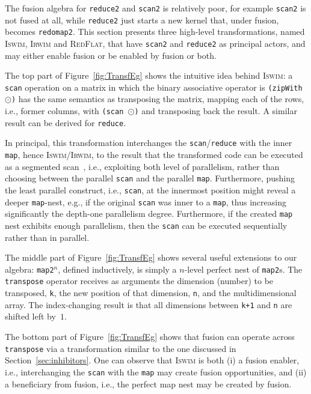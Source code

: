 \documentclass{sigplanconf}  %
\begin{document}
The fusion algebra for {\tt reduce2} and {\tt scan2} is relatively poor,
for example {\tt scan2} is not fused at all, while {\tt reduce2} just
starts a new kernel that, under fusion, becomes {\tt redomap2}.
This section presents three high-level transformations, named
\textsc{Iswim}, \textsc{Irwim} and \textsc{RedFlat}, that have 
{\tt scan2} and {\tt reduce2} as principal actors, and may either
enable fusion or be enabled by fusion or both.

The top part of Figure~\ref{fig:TransfEg} shows the intuitive idea
behind \textsc{Iswim}: a {\tt scan} operation on a matrix in which
the binary associative operator is {\tt (zipWith $\odot$)} has the
same semantics as transposing the matrix, mapping each of the rows,
i.e., former columns, with {\tt (scan $\odot$)} and transposing back
the result. A similar result can be derived for {\tt reduce}.

In principal, this transformation interchanges the {\tt scan}/{\tt reduce}
with the inner {\tt map}, hence \textsc{Iswim}/\textsc{Irwim}, to the result
that the transformed code can be executed as a segmented scan~\cite{segScan},
i.e., exploiting both level of parallelism, rather than choosing between
the parallel {\tt scan} and the parallel {\tt map}. Furthermore, pushing
the least parallel construct, i.e., {\tt scan}, at the innermost position 
might reveal a deeper {\tt map}-nest, e.g., if the original {\tt scan} was 
inner to a {\tt map}, thus increasing significantly the depth-one 
parallelism degree.   
Furthermore, if the created {\tt map} nest exhibits enough parallelism, 
then the {\tt scan} can be executed sequentially rather than in parallel. %

The middle part of Figure~\ref{fig:TransfEg} shows several useful 
extensions to our algebra: {\tt map2$^n$}, defined inductively, is
simply a $n$-level perfect nest of {\tt map2}s.   The {\tt transpose} 
operator receives as arguments the dimension (number) to be transposed, {\tt k}, 
the new position of that dimension, {\tt n}, and the multidimensional array.
The index-changing result is that all dimensions between {\tt k+1} and {\tt n}
are shifted left by~$1$.   

The bottom part of Figure~\ref{fig:TransfEg} shows that fusion can operate 
across {\tt transpose} via a transformation similar to the one discussed
in Section~\ref{sec:inhibitors}. One can observe that \textsc{Iswim} is
both (i) a fusion enabler, i.e., interchanging the {\tt scan} with the {\tt map}
may create fusion opportunities, and (ii) a beneficiary from fusion,
i.e., the perfect map nest may be created by fusion. 
\end{document}
